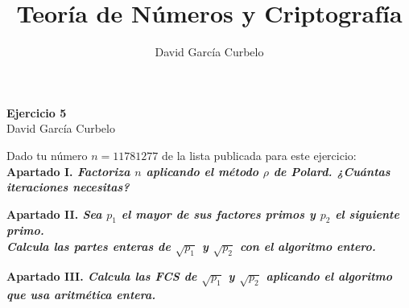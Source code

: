 \documentclass[fleqn]{article}
\author{David García Curbelo}
\title{Teoría de Números y Criptografía}
\begin{document}
    \begin{center}
        \LARGE{\textbf{Ejercicio 5}} \\
        \Large{David García Curbelo} \\
    \end{center}

    \vspace{1cm}
    
    Dado tu número $n = 11781277$ de la lista publicada para este ejercicio: \\ 


    \textbf{Apartado I. \textit{Factoriza $n$ aplicando el método $\rho$ de Polard. ¿Cuántas iteraciones necesitas?}} 

    \newpage
    \textbf{Apartado II. \textit{Sea $p_1$ el mayor de sus factores primos y $p_2$ el siguiente primo.\\ 
    Calcula las partes enteras de $\sqrt{p_1}$ y $\sqrt{p_2}$ con el algoritmo entero.}}

    \newpage
    \textbf{Apartado III. \textit{Calcula las FCS de $\sqrt{p_1}$ y $\sqrt{p_2}$ aplicando el algoritmo que usa aritmética entera.}}
\end{document}
